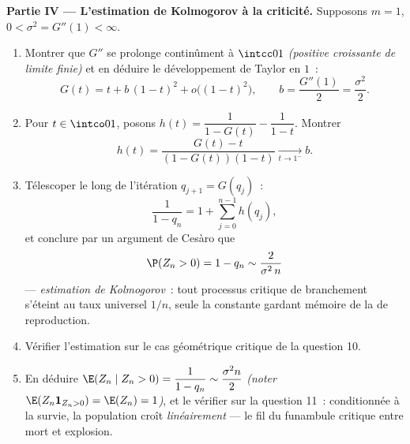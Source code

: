 \begin{problem}
\medskip
\noindent\textbf{Partie IV --- L'estimation de Kolmogorov à la
criticité.} Supposons $m = 1$, $0 < \sigma^2 = G''(1) <
\infty$.
\begin{enumerate}[resume]
  \item Montrer que $G''$ se prolonge continûment à $\intcc01$
        \emph{(positive croissante de limite finie)} et
        en déduire le développement de Taylor en $1$~:
        \[
        G(t) = t + b\,(1-t)^2 + o\bigl((1-t)^2\bigr),
        \qquad b = \frac{G''(1)}2 = \frac{\sigma^2}2 .
        \]
  \item Pour $t \in \intco01$, posons $h(t) = \dfrac1{1 - G(t)} -
        \dfrac1{1 - t}$. Montrer
        \[
        h(t) = \frac{G(t) - t}{(1 - G(t))(1 - t)}
        \xrightarrow[t\to1^-]{} b .
        \]
  \item Télescoper le long de l'itération $q_{j+1} = G(q_j)$~:
        \[
        \frac1{1 - q_n} = 1 + \sum_{j=0}^{n-1}h(q_j),
        \]
        et conclure par un argument de Cesàro que
        \[
        \P(Z_n > 0) = 1 - q_n \sim \frac{2}{\sigma^2\,n}
        \]
        --- \emph{estimation de Kolmogorov}~: tout processus critique
        de branchement s'éteint au taux universel $1/n$,
        seule la constante gardant mémoire de la  de reproduction.
  \item Vérifier l'estimation sur le cas géométrique critique de la
        question 10.
  \item En déduire $\E(Z_n \mid Z_n > 0) = \dfrac{1}{1 - q_n}
        \sim \dfrac{\sigma^2 n}{2}$ \emph{(noter $\E(Z_n
        \mathbf 1_{Z_n>0}) = \E(Z_n) = 1$)}, et le vérifier
        sur la question 11~: conditionnée à la survie, la
        population croît \emph{linéairement} --- le fil du funambule
        critique entre mort et explosion.
\end{enumerate}


\end{problem}
